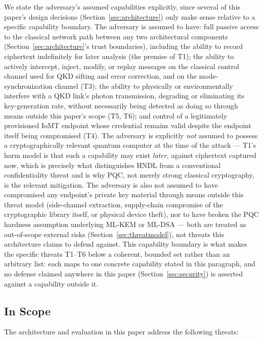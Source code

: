 \documentclass[journal]{IEEEtran}
\begin{document}
We state the adversary's assumed capabilities explicitly, since several of this paper's design decisions (Section~\ref{sec:architecture}) only make sense relative to a specific capability boundary. The adversary is assumed to have: full passive access to the classical network path between any two architectural components (Section~\ref{sec:architecture}'s trust boundaries), including the ability to record ciphertext indefinitely for later analysis (the premise of T1); the ability to actively intercept, inject, modify, or replay messages on the classical control channel used for QKD sifting and error correction, and on the mode-synchronization channel (T3); the ability to physically or environmentally interfere with a QKD link's photon transmission, degrading or eliminating its key-generation rate, without necessarily being detected as doing so through means outside this paper's scope (T5, T6); and control of a legitimately provisioned IoMT endpoint whose credential remains valid despite the endpoint itself being compromised (T4). The adversary is explicitly \emph{not} assumed to possess a cryptographically relevant quantum computer at the time of the attack --- T1's harm model is that such a capability may exist \emph{later}, against ciphertext captured now, which is precisely what distinguishes HNDL from a conventional confidentiality threat and is why PQC, not merely strong classical cryptography, is the relevant mitigation. The adversary is also not assumed to have compromised any endpoint's private key material through means outside this threat model (side-channel extraction, supply-chain compromise of the cryptographic library itself, or physical device theft), nor to have broken the PQC hardness assumption underlying ML-KEM or ML-DSA --- both are treated as out-of-scope external risks (Section~\ref{sec:threatmodel}), not threats this architecture claims to defend against. This capability boundary is what makes the specific threats T1--T6 below a coherent, bounded set rather than an arbitrary list: each maps to one concrete capability stated in this paragraph, and no defense claimed anywhere in this paper (Section~\ref{sec:security}) is asserted against a capability outside it.

\subsection{In Scope}

The architecture and evaluation in this paper address the following threats:
\end{document}
